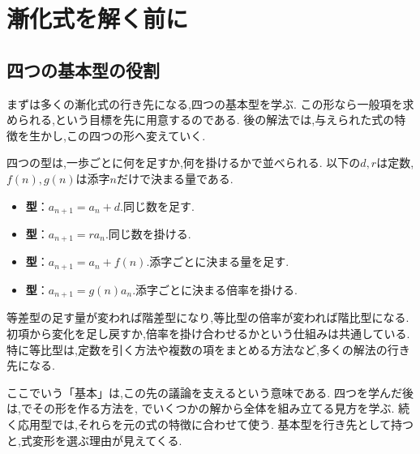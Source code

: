 
\section{漸化式を解く前に}\label{節：漸化式を解く前に}



\subsection{四つの基本型の役割}\label{節：基本型の位置づけ}

  まずは多くの漸化式の行き先になる,四つの基本型を学ぶ.
  この形なら一般項を求められる,という目標を先に用意するのである.
  後の解法では,与えられた式の特徴を生かし,この四つの形へ変えていく.

  四つの型は,一歩ごとに何を足すか,何を掛けるかで並べられる.
  以下の$d,r$は定数,$f(n),g(n)$は添字$n$だけで決まる量である.
  \begin{samepage}
  \begin{itemize}
    \item \textbf{型}：$a_{n+1}=a_n+d$.同じ数を足す.
    \item \textbf{型}：$a_{n+1}=ra_n$.同じ数を掛ける.
    \item \textbf{型}：$a_{n+1}=a_n+f(n)$.添字ごとに決まる量を足す.
    \item \textbf{型}：$a_{n+1}=g(n)a_n$.添字ごとに決まる倍率を掛ける.
  \end{itemize}
  \end{samepage}
  等差型の足す量が変われば階差型になり,等比型の倍率が変われば階比型になる.
  初項から変化を足し戻すか,倍率を掛け合わせるかという仕組みは共通している.
  特に等比型は,定数を引く方法や複数の項をまとめる方法など,多くの解法の行き先になる.

  ここでいう「基本」は,この先の議論を支えるという意味である.
  四つを学んだ後は,でその形を作る方法を,
  でいくつかの解から全体を組み立てる見方を学ぶ.
  続く応用型では,それらを元の式の特徴に合わせて使う.
  基本型を行き先として持つと,式変形を選ぶ理由が見えてくる.
